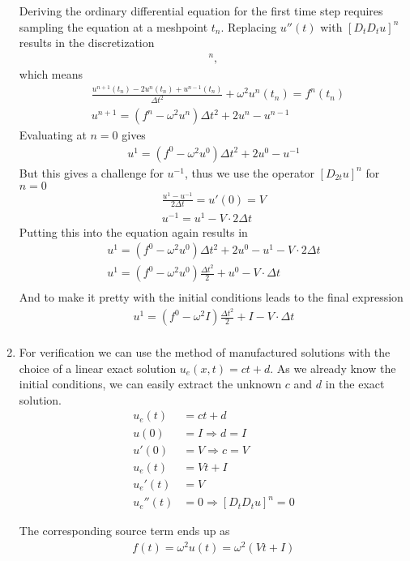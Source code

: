 \documentclass[10pt]{article}
\begin{document}
\begin{enumerate}[label=(\alph*)]
Deriving the ordinary differential equation for the first time step requires sampling the equation at a meshpoint $t_n$. Replacing $u''(t)$ with $[D_tD_tu]^n$ results in the discretization
\begin{align}
  [D_tD_t u + \omega^2u = f]^n,
\end{align}
which means
\begin{align}
  &\frac{u^{n+1}(t_n)-2u^n(t_n)+u^{n-1}(t_n)}{\Delta t^2} + \omega^2u^n(t_n) = f^n(t_n)\\
  &u^{n+1}=(f^n - \omega^2 u^n)\Delta t^2 + 2u^n - u^{n-1}
\end{align}
Evaluating at $n=0$ gives
\begin{align}
u^1 = (f^0 - \omega^2u^0)\Delta t^2 + 2u^0 - u^{-1 }
\end{align}
But this gives a challenge for $u^{-1}$, thus we use the operator $[D_{2t}u]^n$ for $n=0$
\begin{align}
  \frac{u^{1}-u^{-1}}{2\Delta t}=u'(0)=V \\
  u^{-1}=u^1-V\cdot 2\Delta t
\end{align}
Putting this into the equation again results in
\begin{align}
u^1 = (f^0 - \omega^2u^0)\Delta t^2 + 2u^0 - u^1-V\cdot 2\Delta t\\
u^1 = (f^0 - \omega^2u^0)\frac{\Delta t^2}{2} + u^0 -V\cdot \Delta t\\
\end{align}
And to make it pretty with the initial conditions leads to the final expression
\begin{align}
  u^1 = (f^0 - \omega^2I)\frac{\Delta t^2}{2} + I -V\cdot \Delta t\\
\end{align}
\item
For verification we can use the method of manufactured solutions with the choice of a linear exact solution $u_e(x,t)=ct+d$. As we already know the initial conditions, we can easily extract the unknown $c$ and $d$ in the exact solution.
\begin{align*}
  u_e (t) &= ct+d\\
  u(0) &= I \Rightarrow d=I\\
  u'(0) &= V \Rightarrow c=V\\
  u_e(t) &= Vt + I \\
  u_e'(t)&= V \\
  u_e''(t) &= 0 \Rightarrow [D_tD_tu]^n = 0
\end{align*}

The corresponding source term ends up as
\begin{align}
  f(t)=\omega^2u(t)=\omega^2(Vt+I)
\end{align}


\end{enumerate}
\end{document}
